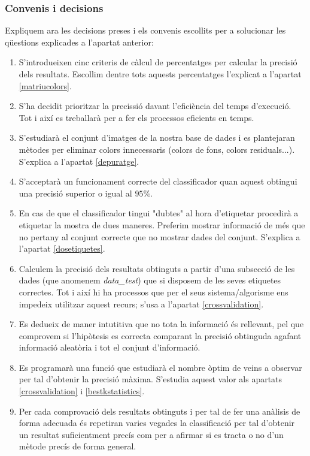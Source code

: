 \documentclass[a4paper, 11pt]{article}
\begin{document}
\subsubsection{Convenis i decisions}
Expliquem ara les decisions preses i els convenis escollits per a solucionar les qüestions explicades a l'apartat anterior:
\begin{enumerate}
    \item S'introdueixen cinc criteris de càlcul de percentatges per calcular la precisió dels resultats. Escollim dentre tots aquests percentatges l'explicat a l'apartat \textcolor{blue}{\ref{matriucolors}}.
    \item S'ha decidit prioritzar la precissió davant l'eficiència del temps d'execució. Tot i així es treballarà per a fer els processos eficients en temps.
    \item S'estudiarà el conjunt d'imatges de la nostra base de dades i es plantejaran mètodes per eliminar colors innecessaris (colors de fons, colors residuals...). S'explica a l'apartat \textcolor{blue}{\ref{depuratge}}.
    \item S'acceptarà un funcionament correcte del classificador quan aquest obtingui una precisió superior o igual al $95\%$. 
    \item En cas de que el classificador tingui "dubtes"\hspace{0.0675} al hora d'etiquetar procedirà a etiquetar la mostra de dues maneres. Preferim mostrar informació de més que no pertany al conjunt correcte que no mostrar dades del conjunt. S'explica a l'apartat \textcolor{blue}{\ref{dosetiquetes}}.
    \item Calculem la precisió dels resultats obtinguts a partir d'una subsecció de les dades (que anomenem \textit{data\_test}) que si disposem de les seves etiquetes correctes. Tot i així hi ha processos que per el seus sistema/algorisme ens impedeix utilitzar aquest recurs; s'usa a l'apartat \textcolor{blue}{\ref{crossvalidation}}.
    \item Es dedueix de maner intutitiva que no tota la informació és rellevant, pel que comprovem si l'hipòtesis es correcta comparant la precisió obtinguda agafant informació aleatòria i tot el conjunt d'informació.
    \item Es programarà una funció que estudiarà el nombre òptim de veins a observar per tal d'obtenir la precisió màxima. S'estudia aquest valor als apartats \textcolor{blue}{\ref{crossvalidation}} i \textcolor{blue}{\ref{bestkstatistics}}.
    \item Per cada comprovació dels resultats obtinguts i per tal de fer una anàlisis de forma adecuada és repetiran varies vegades la classificació per tal d'obtenir un resultat suficientment precís com per a afirmar si es tracta o no d'un mètode precís de forma general.

\end{enumerate}
\end{document}
